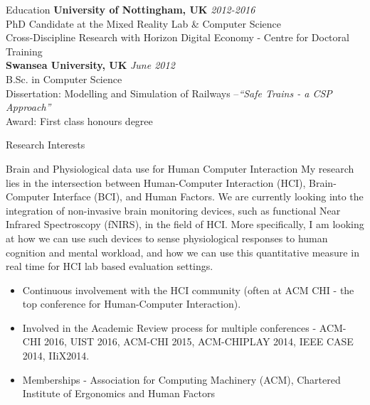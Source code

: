\documentclass{resume} %
\begin{document}

\begin{rSection}{Education}
{\bf University of Nottingham, UK} \hfill {\em 2012-2016} \\
PhD Candidate at the Mixed Reality Lab \& Computer Science \\
Cross-Discipline Research with Horizon Digital Economy - Centre for Doctoral Training \smallskip \\


{\bf Swansea University, UK} \hfill {\em June 2012} \\
B.Sc. in Computer Science \\
Dissertation: Modelling and Simulation of Railways –\emph{``Safe Trains - a CSP Approach''}\smallskip \\
Award: First class honours degree

\end{rSection}

\begin{rSection}{Research Interests}
\begin{rSubsection}{Brain and Physiological data use for Human Computer Interaction}{ }{ }{ }
My research lies in the intersection between Human-Computer Interaction (HCI), Brain-Computer
Interface (BCI), and Human Factors. We are currently looking into the integration of non-invasive
brain monitoring devices, such as functional Near Infrared Spectroscopy (fNIRS), in the field of HCI.
More specifically, I am looking at how we can use such devices to sense physiological responses to
human cognition and mental workload, and how we can use this quantitative measure in real time for HCI lab based evaluation settings.

\begin{itemize}
  \item Continuous involvement with the HCI community (often at ACM CHI - the top conference for Human-Computer Interaction).
  \item Involved in the Academic Review process for multiple conferences - ACM-CHI 2016, UIST 2016, ACM-CHI 2015, ACM-CHIPLAY 2014, IEEE CASE 2014, IIiX2014.
  \item  Memberships - Association for Computing Machinery (ACM), Chartered Institute of Ergonomics and Human Factors
\end{itemize}

\end{rSubsection}

\end{rSection}
\end{document}
